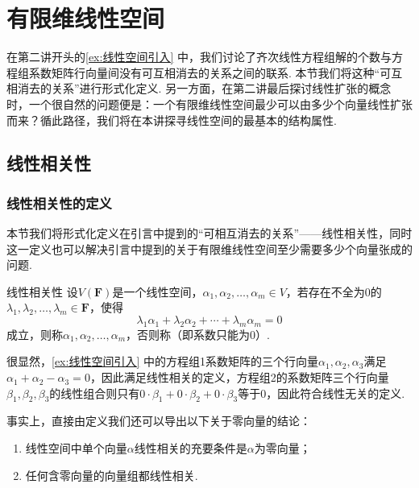 \chapter{有限维线性空间}

在第二讲开头的\autoref{ex:线性空间引入} 中，我们讨论了齐次线性方程组解的个数与方程组系数矩阵行向量间没有可互相消去的关系之间的联系. 本节我们将这种``可互相消去的关系''进行形式化定义. 另一方面，在第二讲最后探讨线性扩张的概念时，一个很自然的问题便是：一个有限维线性空间最少可以由多少个向量线性扩张而来？循此路径，我们将在本讲探寻线性空间的最基本的结构属性.

\section{线性相关性}

\subsection{线性相关性的定义}

本节我们将形式化定义在引言中提到的``可相互消去的关系''——线性相关性，同时这一定义也可以解决引言中提到的关于有限维线性空间至少需要多少个向量张成的问题.
\begin{definition}{线性相关性}{}  
    设$V(\mathbf{F})$是一个线性空间，$\alpha_1,\alpha_2,\ldots,\alpha_m\in V$，若存在不全为0的$\lambda_1,\lambda_2,\ldots,\lambda_m\in\mathbf{F}$，使得
    \[\lambda_1\alpha_1+\lambda_2\alpha_2+\cdots+\lambda_m\alpha_m=0\]
    成立，则称$\alpha_1,\alpha_2,\ldots,\alpha_m$，否则称（即系数只能为0）.
\end{definition}
很显然，\autoref{ex:线性空间引入} 中的方程组1系数矩阵的三个行向量$\alpha_1,\alpha_2,\alpha_3$满足$\alpha_1+\alpha_2-\alpha_3=0$，因此满足线性相关的定义，方程组2的系数矩阵三个行向量$\beta_1,\beta_2,\beta_3$的线性组合则只有$0\cdot\beta_1+0\cdot\beta_2+0\cdot\beta_3$等于0，因此符合线性无关的定义.

事实上，直接由定义我们还可以导出以下关于零向量的结论：
\begin{enumerate}
    \item 线性空间中单个向量$\alpha$线性相关的充要条件是$\alpha$为零向量；

    \item 任何含零向量的向量组都线性相关.
\end{enumerate}


